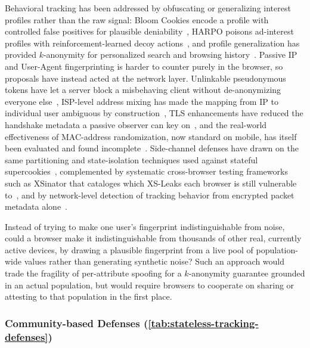 Behavioral tracking has been addressed by obfuscating or generalizing interest profiles rather than the raw signal: Bloom Cookies encode a profile with controlled false positives for plausible deniability~\cite{morBloomCookiesWeb2015}, HARPO poisons ad-interest profiles with reinforcement-learned decoy actions~\cite{zhangHARPOLearningSubvert2022}, and profile generalization has provided $k$-anonymity for personalized search and browsing history~\cite{zhuAnonymizingUserProfiles2010,zhengWebUserDeidentification2008}.
%
Passive IP and User-Agent fingerprinting is harder to counter purely in the browser, so proposals have instead acted at the network layer. 
%
Unlinkable pseudonymous tokens have let a server block a misbehaving client without de-anonymizing everyone else~\cite{johnsonNymbleAnonymousIPAddress2007}, ISP-level address mixing has made the mapping from IP to individual user ambiguous by construction~\cite{raghavanEnlistingISPsImprove2009}, TLS enhancements have reduced the handshake metadata a passive observer can key on~\cite{syEnhancedPerformancePrivacy2020}, and the real-world effectiveness of MAC-address randomization, now standard on mobile, has itself been evaluated and found incomplete~\cite{fenskeThreeYearsLater2021}.
%
Side-channel defenses have drawn on the same partitioning and state-isolation techniques used against stateful supercookies~\cite{jacksonProtectingBrowserState2006}, complemented by systematic cross-browser testing frameworks such as XSinator that cataloges which XS-Leaks each browser is still vulnerable to~\cite{knittelXSinatorcomFormalModel2021}, and by network-level detection of tracking behavior from encrypted packet metadata alone~\cite{leeNettrackGenericWeb2023}.


\begin{opbox}
Instead of trying to make one user's fingerprint indistinguishable from noise, could a browser make it indistinguishable from thousands of other real, currently active devices, by drawing a plausible fingerprint from a live pool of population-wide values rather than generating synthetic noise? Such an approach would trade the fragility of per-attribute spoofing for a $k$-anonymity guarantee grounded in an actual population, but would require browsers to cooperate on sharing or attesting to that population in the first place.
\end{opbox}


\subsubsection{Community-based Defenses (\autoref{tab:stateless-tracking-defenses})}
\label{sec:stateless-defenses-community}



